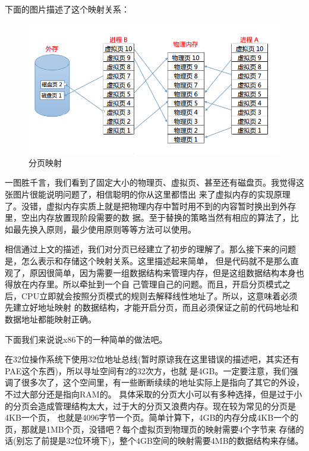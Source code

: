 \par 下面的图片描述了这个映射关系：

\begin{figure}[H]
      \centering
      \includegraphics[scale=0.35]{picture/chapt9/PAGE_MAP.png}
      \caption{分页映射}
\end{figure}

\par 一图胜千言，我们看到了固定大小的物理页、虚拟页、甚至还有磁盘页。我觉得这张图片很能说明问题了，相信聪明的你从这里都悟出\allowbreak
来了虚拟内存的实现原理了。没错，虚拟内存实质上就是把物理内存中暂时用不到的内容暂时换出到外存里，空出内存放置现阶段需要的数\allowbreak
据。至于替换的策略当然有相应的算法了，比如最先换入原则，最少使用原则等等方法可以使用。

\par 相信通过上文的描述，我们对分页已经建立了初步的理解了。那么接下来的问题是，怎么表示和存储这个映射关系。这里描述起来简单，\allowbreak
但是代码就不是那么直观了，原因很简单，因为需要一组数据结构来管理内存，但是这组数据结构本身也得放在内存里。所以牵扯到一个自\allowbreak
己管理自己的问题。而且，开启分页模式之后，CPU立即就会按照分页模式的规则去解释线性地址了。所以，这意味着必须先建立好地址映射\allowbreak
的数据结构，才能开启分页，而且必须保证之前的代码地址和数据地址都能映射正确。

\par 下面我们来说说x86下的一种简单的做法吧。

\par 在32位操作系统下使用32位地址总线(暂时原谅我在这里错误的描述吧，其实还有PAE这个东西)，所以寻址空间有2的32次方，也就\allowbreak
是4GB。一定要注意，我们强调了很多次了，这个空间里，有一些断断续续的地址实际上是指向了其它的外设，不过大部分还是指向RAM的。\allowbreak
具体采取的分页大小可以有多种选择，但是过于小的分页会造成管理结构太大，过于大的分页又浪费内存。现在较为常见的分页是4KB一个页，\allowbreak
也就是4096字节一个页。简单计算下，4GB的内存分成4KB一个的页，那就是1MB个页，没错吧？每个虚拟页到物理页的映射需要4个字节来\allowbreak
存储的话(别忘了前提是32位环境下)，整个4GB空间的映射需要4MB的数据结构来存储。

